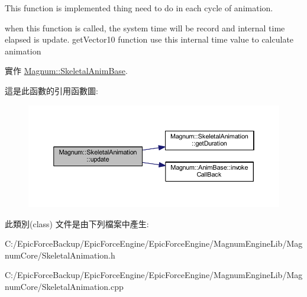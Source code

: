 This function is implemented thing need to do in each cycle of animation. 

when this function is called, the system time will be record and internal time elapsed is update. get\+Vector10 function use this internal time value to calculate animation 

實作 \hyperlink{class_magnum_1_1_skeletal_anim_base_a860f65cce1f9f3074dd6584262c18f35}{Magnum\+::\+Skeletal\+Anim\+Base}.



這是此函數的引用函數圖\+:\nopagebreak
\begin{figure}[H]
\begin{center}
\leavevmode
\includegraphics[width=350pt]{class_magnum_1_1_skeletal_animation_a2770fe6c5215d7ba5a28df07ac926ae5_cgraph}
\end{center}
\end{figure}




此類別(class) 文件是由下列檔案中產生\+:\begin{DoxyCompactItemize}
\item 
C\+:/\+Epic\+Force\+Backup/\+Epic\+Force\+Engine/\+Epic\+Force\+Engine/\+Magnum\+Engine\+Lib/\+Magnum\+Core/Skeletal\+Animation.\+h\item 
C\+:/\+Epic\+Force\+Backup/\+Epic\+Force\+Engine/\+Epic\+Force\+Engine/\+Magnum\+Engine\+Lib/\+Magnum\+Core/Skeletal\+Animation.\+cpp\end{DoxyCompactItemize}

